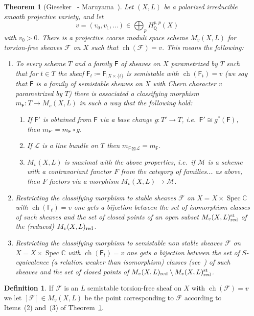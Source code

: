 \documentclass[11pt]{amsart}
\newcommand{\CC}{{\mathbb C}}
\newcommand{\QQ}{{\mathbb Q}}
\let\mathcal\mathscr
\def\cF{\mathcal{F}}
\def\cL{\mathcal{L}}
\def\cM{\mathcal{M}}
\def\sF{{\mathsf F}}
\DeclareMathOperator{\ch}{ch}
\DeclareMathOperator{\Spec}{Spec}
\newtheorem{thm}[lmm]{Theorem}
\theoremstyle{definition}
\newtheorem{dfn}[lmm]{Definition}
\theoremstyle{remark}
\begin{document}
\begin{thm}[Gieseker~\cite{gieseker:modfasci} - Maruyama~\cite{maruyama:modfasci}]\label{thm:modfasci}
%
Let $(X,L)$ be a polarized irreducible smooth projective variety, and let
%
\begin{equation}
%
v=(v_0,v_1,\ldots)\in\bigoplus _p H^{p,p}_{\QQ}(X)
%
\end{equation}
%
with $v_0>0$. 
There is a projective \emph{coarse moduli space} scheme $M_v(X,L)$ for torsion-free sheaves $\cF$ on $X$ such that 
$\ch(\cF)=v$. This means the following:
%
\begin{enumerate}
%
\item
%
To every  scheme $T$ and a family $\sF$ of  sheaves on $X$  parametrized by $T$
 such that  for $t\in T$ the sheaf $\sF_t\coloneqq\sF_{|X\times\{t\}}$ is semistable with $\ch(\sF_t)=v$ (we say that $\sF$ is a \emph{family of semistable sheaves on $X$ with Chern character $v$ parametrized by $T$}) there is associated a  classifying morphism $m_{\sF}\colon T\to M_v(X,L)$ in such a way that the following hold:
%
\begin{enumerate}
%
\item
%
If $\sF'$ is obtained from $\sF$ via a base change $g\colon T'\to T$, i.e.~$\sF'\cong g^{*}(\sF)$, then $m_{\sF'}=m_{\sF}\circ g$.
%
\item
%
If $\cL$ is a line bundle on $T$ then $m_{\sF\boxtimes\cL}=m_{\sF}$.
%
\item
%
$M_v(X,L)$ is maximal with the above properties, i.e.~if $\cM$ is a scheme with a contravariant functor $F$ from the category of families... as above, then $F$ factors via a morphism $M_v(X,L)\to\cM$.
%
\end{enumerate}
%
%
\item
%
Restricting the classifying morphism to stable sheaves $\cF$ on $X=X\times\Spec\CC$ with $\ch(\sF_t)=v$  one gets a bijection between the set of isomorphism classes of such sheaves and the set of closed points of an open subset $M_v(X,L)^{\rm st}_{\rm red}$ of the (reduced) $M_v(X,L)_{\rm red}$. 
%
\item
%
Restricting the classifying morphism to semistable non stable sheaves $\cF$ on $X=X\times\Spec\CC$ with 
$\ch(\sF_t)=v$  one gets a bijection between the set of {$S$-equivalence} (a relation 
weaker than isomorphism) classes 
(see~\cite[Sect.~1.5]{huy-lehn:librofasci}) of  such sheaves  and the set of closed points of  
$M_v(X,L)_{\rm red}\setminus M_v(X,L)^{\rm st}_{\rm red}$. 
%
\end{enumerate}
%
%
\end{thm}
%
%
\begin{dfn}\label{dfn:puntoesse}
%
If  $\cF$ is an $L$ semistable torsion-free sheaf on $X$ with $\ch(\cF)=v$ 
we let $[\cF]\in M_v(X,L)$ be the point corresponding to $\cF$ according to Items~(2) and~(3) of Theorem~\ref{thm:modfasci}. 
%
\end{dfn}
%
\end{document}
